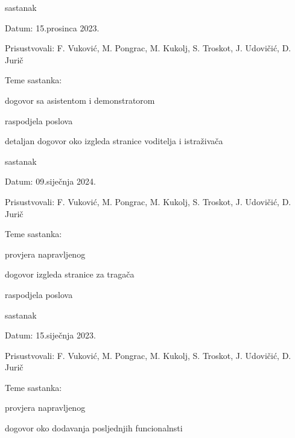\begin{packed_enum}
			\item  sastanak
			\item[] \begin{packed_item}
				\item Datum: 15.prosinca 2023.
				\item Prisustvovali: F. Vuković, M. Pongrac, M. Kukolj, S. Troskot, J. Udovičić, D. Jurič
				\item Teme sastanka:
				\begin{packed_item}
					\item dogovor sa asistentom i demonstratorom
					\item raspodjela poslova
					\item detaljan dogovor oko izgleda stranice voditelja i istraživača
				\end{packed_item}
			\end{packed_item}

			\item  sastanak
			\item[] \begin{packed_item}
				\item Datum: 09.siječnja 2024.
				\item Prisustvovali: F. Vuković, M. Pongrac, M. Kukolj, S. Troskot, J. Udovičić, D. Jurič
				\item Teme sastanka:
				\begin{packed_item}
					\item provjera napravljenog
					\item dogovor izgleda stranice za tragača
					\item raspodjela poslova
				\end{packed_item}
			\end{packed_item}


			\item  sastanak
			\item[] \begin{packed_item}
				\item Datum: 15.siječnja 2023.
				\item Prisustvovali: F. Vuković, M. Pongrac, M. Kukolj, S. Troskot, J. Udovičić, D. Jurič
				\item Teme sastanka:
				\begin{packed_item}
					\item provjera napravljenog
					\item dogovor oko dodavanja posljednjih funcionalnsti
				\end{packed_item}
			\end{packed_item}
			
		\end{packed_enum}
		
